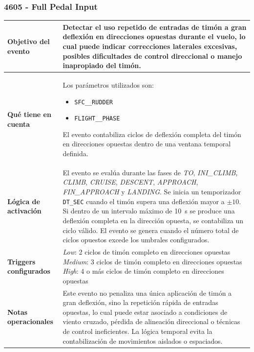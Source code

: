 \documentclass[11pt,a4paper]{article}
\begin{document}
	\subsubsection{4605 - Full Pedal Input}
	\begin{table}[H]
		\centering
		\renewcommand{\arraystretch}{1.3}
		\begin{tabular}{p{5cm} p{9.5cm}}
			\hline
			\textbf{Objetivo del evento} &
			Detectar el uso repetido de entradas de timón a gran deflexión en direcciones opuestas durante el vuelo, lo cual puede indicar correcciones laterales excesivas, posibles dificultades de control direccional o manejo inapropiado del timón. \\
			\hline
			\textbf{Qué tiene en cuenta} &
			Los parámetros utilizados son:
			\begin{itemize}
				\item \texttt{SFC\_\_RUDDER}
				\item \texttt{FLIGHT\_\_PHASE}
			\end{itemize}
			El evento contabiliza ciclos de deflexión completa del timón en direcciones opuestas dentro de una ventana temporal definida. \\
			\hline
			\textbf{Lógica de activación} &
			El evento se evalúa durante las fases de \textit{TO}, \textit{INI\_CLIMB}, \textit{CLIMB}, \textit{CRUISE}, \textit{DESCENT}, \textit{APPROACH}, \textit{FIN\_APPROACH} y \textit{LANDING}. 
			Se inicia un temporizador \texttt{DT\_SEC} cuando el timón supera una deflexión mayor a $\pm10$. 
			Si dentro de un intervalo máximo de \SI{10}{s} se produce una deflexión completa en la dirección opuesta, se contabiliza un ciclo válido. 
			El evento se genera cuando el número total de ciclos opuestos excede los umbrales configurados. \\
			\hline
			\textbf{Triggers configurados} &
			\textit{Low}: 2 ciclos de timón completo en direcciones opuestas \newline
			\textit{Medium}: 3 ciclos de timón completo en direcciones opuestas \newline
			\textit{High}: 4 o más ciclos de timón completo en direcciones opuestas \\
			\hline
			\textbf{Notas operacionales} &
			Este evento no penaliza una única aplicación de timón a gran deflexión, sino la repetición rápida de entradas opuestas, lo cual puede estar asociado a condiciones de viento cruzado, pérdida de alineación direccional o técnicas de control ineficientes. La lógica temporal evita la contabilización de movimientos aislados o espaciados. \\
			\hline
		\end{tabular}
	\end{table}
\end{document}
